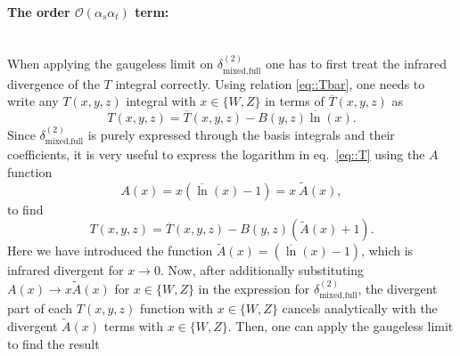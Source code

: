 \documentclass[a4paper,12pt]{book}
\begin{document}
\paragraph{The order $\mathcal{O}(\alpha_s\alpha_t)$ term:}~\\
When applying the gaugeless limit on $\delta^{(2)}_\text{mixed,full}$ one has to first treat the infrared divergence of the $T$ integral correctly. Using relation \eqref{eq::Tbar}, one needs to write any $T(x,y,z)$ integral with $x\in\{W,Z\}$ in terms of $\overline{T}(x,y,z)$ as  
\begin{equation}
\label{eq::T}
T(x,y,z) = \overline{T}(x,y,z)-B(y,z)\overline{\ln}(x).
\end{equation}
Since $\delta^{(2)}_\text{mixed,full}$ is purely expressed through the basis integrals and their coefficients, it is very useful to express the logarithm in eq.\ \eqref{eq::T} using the $A$ function
\begin{equation}
\label{eq::Afunction}
A(x) = x(\overline{\ln}(x)-1) = x\> \tilde{A}(x),
\end{equation}
to find 
\begin{equation}
T(x,y,z) = \overline{T}(x,y,z)-B(y,z)\left(\tilde{A}(x)+1\right).
\end{equation}
Here we have introduced the function $\tilde{A}(x)=(\overline{\ln}(x)-1)$, which is infrared divergent for $x\rightarrow 0$. Now, after additionally substituting $A(x) \rightarrow x \tilde{A}(x)$ for $x \in \{W,Z\}$ in the expression for $\delta^{(2)}_\text{mixed,full}$, the divergent part of each $T(x,y,z)$ function with $x \in \{W,Z\}$ cancels analytically with the divergent $\tilde{A}(x)$ terms with $x \in \{W,Z\}$. Then, one can apply the gaugeless limit to find the result 
\end{document}
